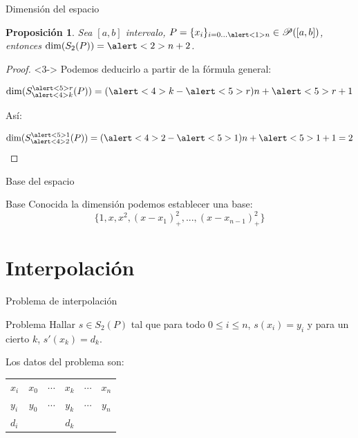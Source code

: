 \documentclass[compress]{beamer}
\newtheorem*{proposicion}{Proposición}
\theoremstyle{definition}
\theoremstyle{remark}
\begin{document}
\begin{frame}{Dimensión del espacio}
\begin{proposicion}
Sea $[a,b]$ intervalo, $P = \{x_i\}_{i=0...\alert<1>{n}} \in \mathscr{P}([a,b])$,
entonces $\dim(S_2(P)) = \alert<2>{n+2}$.
\end{proposicion}
\begin{proof}<3->
Podemos deducirlo a partir de la fórmula general:

\[
\dim(S_{\alert<4>{k}}^{\alert<5>{r}}(P)) = (\alert<4>{k} - \alert<5>{r})n
+ \alert<5>{r} + 1
\]

Así:

\[\dim(S_{\alert<4>{2}}^{\alert<5>{1}}(P)) = (\alert<4>{2} - \alert<5>{1})n + \alert<5>{1} + 1 = 2\]
\end{proof}
\end{frame}

\begin{frame}{Base del espacio}
\begin{block}{Base}
Conocida la dimensión podemos establecer una base:
\[\{1, x, x^2, (x-x_1)_+^2, ... , (x-x_{n-1})_+^2\}\]
\end{block}
\end{frame}

\section{Interpolación}

\begin{frame}{Problema de interpolación}
\begin{exampleblock}{Problema}
Hallar $s \in S_2(P)$ tal que para todo $0 \leq i \leq n$, $s(x_i) = y_i$ y
para un cierto $k$, $s'(x_k) = d_k$.
\end{exampleblock}

\vfill

Los datos del problema son:
\begin{table}[h]
\centering
\begin{tabular}{l|ccccc}
$x_i$ & $x_0$ & $\cdots$ & $x_k$ & $\cdots$ & $x_n$ \\
$y_i$ & $y_0$ & $\cdots$ & $y_k$ & $\cdots$ & $y_n$ \\
$d_i$ & &  & $d_k$ &  &
\end{tabular}
\end{table}
\end{frame}
\end{document}
